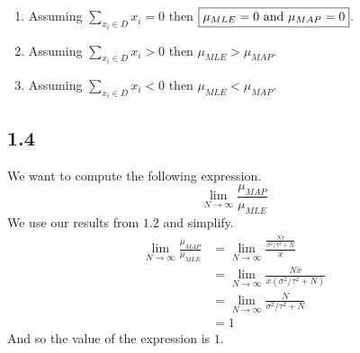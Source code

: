 \documentclass[submit]{harvardml}
\begin{document}
\begin{enumerate}[label=(\alph*)]
    \item Assuming $\sum_{x_i \in D} x_i = 0$ then $\boxed{\mu_{MLE} = 0$ and $\mu_{MAP} = 0}$.
    
    \item Assuming $\sum_{x_i \in D} x_i > 0$ then $\boxed{\mu_{MLE} > \mu_{MAP}}$.
    
    \item Assuming $\sum_{x_i \in D} x_i < 0$ then $\boxed{\mu_{MLE} < \mu_{MAP}}$.
\end{enumerate}

\subsection*{1.4}
We want to compute the following expression.
\begin{equation*}
    \lim_{N \rightarrow \infty} \frac{\mu_{MAP}}{\mu_{MLE}}
\end{equation*}
We use our results from $1.2$ and simplify.
\begin{align*}
    \lim_{N \rightarrow \infty} \frac{\mu_{MAP}}{\mu_{MLE}} &= \lim_{N \rightarrow \infty} \frac{\frac{N \bar{x}}{\sigma^2 / \tau^2 + N}}{\bar{x}} \\
    &= \lim_{N \rightarrow \infty} \frac{N \bar{x}}{\bar{x} (\sigma^2 / \tau^2 + N)} \\
    &= \lim_{N \rightarrow \infty} \frac{N }{\sigma^2 / \tau^2 + N} \\
    &= 1
\end{align*}
And so the value of the expression is $\boxed{1}$.



\newpage
\end{document}
